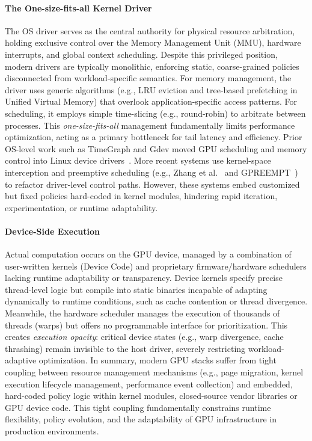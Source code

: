 \paragraph{The One-size-fits-all Kernel Driver}
The OS driver serves as the central authority for physical resource arbitration, holding exclusive control over the Memory Management Unit (MMU), hardware interrupts, and global context scheduling. Despite this privileged position, modern drivers are typically monolithic, enforcing static, coarse-grained policies disconnected from workload-specific semantics. For memory management, the driver uses generic algorithms (e.g., LRU eviction and tree-based prefetching in Unified Virtual Memory) that overlook application-specific access patterns. For scheduling, it employs simple time-slicing (e.g., round-robin) to arbitrate between processes. This \emph{one-size-fits-all} management fundamentally limits performance optimization, acting as a primary bottleneck for tail latency and efficiency. Prior OS-level work such as TimeGraph and Gdev moved GPU scheduling and memory control into Linux device drivers~\cite{timegraph,gdev}. More recent systems use kernel-space interception and preemptive scheduling (e.g., Zhang et al.~\cite{kernelintercept} and GPREEMPT~\cite{gpreempt}) to refactor driver-level control paths. However, these systems embed customized but fixed policies hard-coded in kernel modules, hindering rapid iteration, experimentation, or runtime adaptability.

\paragraph{Device-Side Execution}
Actual computation occurs on the GPU device, managed by a combination of user-written kernels (Device Code) and proprietary firmware/hardware schedulers lacking runtime adaptability or transparency. Device kernels specify precise thread-level logic but compile into static binaries incapable of adapting dynamically to runtime conditions, such as cache contention or thread divergence. Meanwhile, the hardware scheduler manages the execution of thousands of threads (warps) but offers no programmable interface for prioritization. This creates \emph{execution opacity}: critical device states (e.g., warp divergence, cache thrashing) remain invisible to the host driver, severely restricting workload-adaptive optimization. In summary, modern GPU stacks suffer from tight coupling between resource management mechanisms (e.g., page migration, kernel execution lifecycle management, performance event collection) and embedded, hard-coded policy logic within kernel modules, closed-source vendor libraries or GPU device code. This tight coupling fundamentally constrains runtime flexibility, policy evolution, and the adaptability of GPU infrastructure in production environments.

